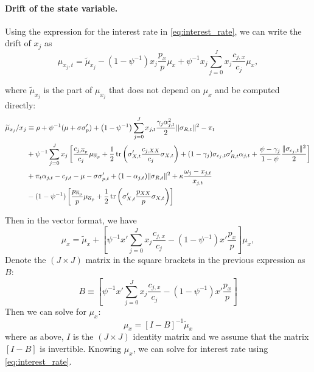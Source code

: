 \paragraph{Drift of the state variable.}

Using the expression for the interest rate in \eqref{eq:interest_rate}, we can write the drift of $ x_j $ as 
\begin{equation}\label{eq:mu_xj}
	\mu_{x_j,t}=\widetilde{\mu}_{x_j}-\left(1-\psi^{-1}\right)x_j\frac{p_x}{p}\mu_x+\psi^{-1}x_j\sum_{j=0}^{J}x_j\frac{c_{j,x}}{c_j}\mu_x,
\end{equation}

where $ \widetilde{\mu}_{x_j} $ is the part of $ \mu_{x_j} $ that does not depend on $ \mu_x $ and be computed directly:
\begin{align*}
	\widetilde{\mu}_{x_j}/x_j&\equiv \rho+\psi^{-1}(\mu+\sigma\sigma_p')+ \left (1-\psi^{-1}\right )  \sum_{j=0}^J x_{j,t}\frac{\gamma_j \alpha_{j,t}^2}{2} ||\sigma_{R,t}||^2- \pi_t\nonumber\\
	& +\psi^{-1}\sum_{j=0}^Jx_j\left[\frac{c_{j,\overline{\alpha}_p}}{c_j}\mu_{\overline{\alpha}_p}+\frac{1}{2}\operatorname{tr}\left(\sigma_{X,t}'\frac{c_{j,XX}}{c_j}\sigma_{X,t}\right)+ (1-\gamma_j)  \sigma_{c_j,t} \sigma_{R,t}' \alpha_{j,t} + \frac{\psi - \gamma_j}{1-\psi} \frac{\|\sigma_{c_j,t}\|^2}{2}\right]\nonumber\\
	&+ \pi_t \alpha_{j,t} - c_{j,t} -\mu - \sigma \sigma_{p,t}'  +(1- \alpha_{j,t}) \|\sigma_{R,t}\|^2  +\kappa \frac{\omega_j-x_{j,t}}{x_{j,t}} \nonumber\\
	&-(1-\psi^{-1})\left[\frac{p_{\overline{\alpha}_p}}{p}\mu_{\overline{\alpha}_p}+\frac{1}{2}\operatorname{tr}\left(\sigma_{X,t}'\frac{p_{XX}}{p}\sigma_{X,t}\right)\right]
\end{align*}

Then in the vector format, we have
\begin{equation}\label{eq:mux}
	\mu_x=\widetilde{\mu}_x+\left[\psi^{-1}x'\sum_{j=0}^{J}x_j\frac{c_{j,x}}{c_j}-\left(1-\psi^{-1}\right)x'\frac{p_x}{p}\right]\mu_x,
\end{equation}
Denote the $ (J\times J) $ matrix in the square brackets in the previous expression as $ B $:
\begin{equation}
	B\equiv\left[\psi^{-1}x'\sum_{j=0}^{J}x_j\frac{c_{j,x}}{c_j}-\left(1-\psi^{-1}\right)x'\frac{p_x}{p}\right]
\end{equation}
Then we can solve for $ \mu_x $:
\begin{equation}\label{eq:mux2}
	\mu_x=\left[I-B\right]^{-1}\widetilde{\mu}_x
\end{equation}
where as above, $ I $ is the $ (J\times J) $ identity matrix and we assume that the matrix $\left[I-B\right]$ is invertible.
Knowing $ \mu_x $, we can solve for interest rate using \eqref{eq:interest_rate}.

